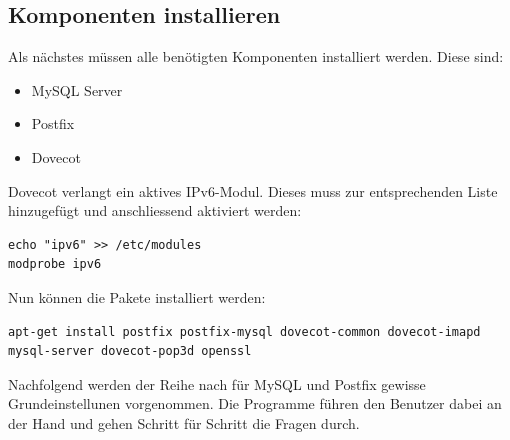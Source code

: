 

\subsection{Komponenten installieren}
Als nächstes müssen alle benötigten Komponenten installiert werden.
Diese sind:
\begin{itemize}
\item MySQL Server \\
\item Postfix \\
\item Dovecot \\
\end{itemize}

Dovecot verlangt ein aktives IPv6-Modul. Dieses muss zur entsprechenden Liste hinzugefügt und anschliessend aktiviert werden:

\begin{lstlisting}
echo "ipv6" >> /etc/modules
modprobe ipv6
\end{lstlisting}

Nun können die Pakete installiert werden:

\begin{lstlisting}
apt-get install postfix postfix-mysql dovecot-common dovecot-imapd mysql-server dovecot-pop3d openssl
\end{lstlisting}

Nachfolgend werden der Reihe nach für MySQL und Postfix gewisse Grundeinstellunen vorgenommen. Die Programme führen den Benutzer dabei an der Hand und gehen Schritt für Schritt die Fragen durch.


